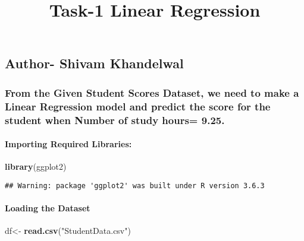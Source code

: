 \documentclass[
]{article}
\title{Task-1 Linear Regression}
\author{}
\date{\vspace{-2.5em}}
\newenvironment{Shaded}{\begin{snugshade}}{\end{snugshade}}
\newcommand{\KeywordTok}[1]{\textcolor[rgb]{0.13,0.29,0.53}{\textbf{#1}}}
\newcommand{\NormalTok}[1]{#1}
\newcommand{\StringTok}[1]{\textcolor[rgb]{0.31,0.60,0.02}{#1}}
\begin{document}
\maketitle

\hypertarget{author--shivam-khandelwal}{%
\subsection{Author- Shivam Khandelwal}\label{author--shivam-khandelwal}}

\hypertarget{from-the-given-student-scores-dataset-we-need-to-make-a-linear-regression-model-and-predict-the-score-for-the-student-when-number-of-study-hours-9.25.}{%
\subsubsection{From the Given Student Scores Dataset, we need to make a
Linear Regression model and predict the score for the student when
Number of study hours=
9.25.}\label{from-the-given-student-scores-dataset-we-need-to-make-a-linear-regression-model-and-predict-the-score-for-the-student-when-number-of-study-hours-9.25.}}

\hypertarget{importing-required-libraries}{%
\paragraph{Importing Required
Libraries:}\label{importing-required-libraries}}

\begin{Shaded}
\begin{Highlighting}[]
\KeywordTok{library}\NormalTok{(ggplot2)}
\end{Highlighting}
\end{Shaded}

\begin{verbatim}
## Warning: package 'ggplot2' was built under R version 3.6.3
\end{verbatim}

\hypertarget{loading-the-dataset}{%
\paragraph{Loading the Dataset}\label{loading-the-dataset}}

\begin{Shaded}
\begin{Highlighting}[]
\NormalTok{df<-}\StringTok{ }\KeywordTok{read.csv}\NormalTok{(}\StringTok{"StudentData.csv"}\NormalTok{)}
\end{Highlighting}
\end{Shaded}
\end{document}
